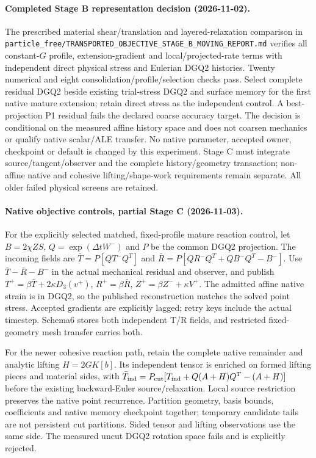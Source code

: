 \documentclass[11pt]{article}
\begin{document}
\paragraph{Completed Stage B representation decision (2026-11-02).}
The prescribed material shear/translation and layered-relaxation comparison in
\texttt{particle\_free/TRANSPORTED\_OBJECTIVE\_STAGE\_B\_MOVING\_REPORT.md}
verifies all constant-$G$ profile, extension-gradient and local/projected-rate
terms with independent direct physical stress and Eulerian DGQ2 histories.
Twenty numerical and eight consolidation/profile/selection checks pass.
Select complete residual DGQ2 beside existing trial-stress DGQ2 and surface
memory for the first native mature extension; retain direct stress as the
independent control. A best-projection P1 residual fails the declared coarse
accuracy target. The decision is conditional on the measured affine history
space and does not coarsen mechanics or qualify native scalar/ALE transfer.
No native parameter, accepted owner, checkpoint or default is changed by this
experiment. Stage C must integrate source/tangent/observer and the complete
history/geometry transaction; non-affine native and cohesive lifting/shape-work
requirements remain separate. All older failed physical screens are retained.


\paragraph{Native objective controls, partial Stage C (2026-11-03).}
For the explicitly selected matched, fixed-profile mature reaction control,
let $B=2\chi ZS$, $Q=\exp(\Delta t W^-)$ and $P$ be the common DGQ2 projection.
The incoming fields are
$\bar T=P[QT^-Q^T]$ and
$\bar R=P[QR^-Q^T+QB^-Q^T-B^-]$.
Use $\bar T-\bar R-B^-$ in the actual mechanical residual and observer, and
publish $T^+=\beta\bar T+2\kappa D_3(v^+)$,
$R^+=\beta\bar R$, $Z^+=\beta Z^-+\kappa V^+$.
The admitted affine native strain is in DGQ2, so the published reconstruction
matches the solved point stress. Accepted gradients are explicitly lagged;
retry keys include the actual timestep. Schema6 stores both independent
T/R fields, and restricted fixed-geometry mesh transfer carries both.

For the newer cohesive reaction path, retain the complete native remainder
and analytic lifting $H=2G K[b]$. Its independent tensor is enriched on formed
lifting pieces and material sides, with
$\bar T_{\rm ind}=P_{\rm cut}[T_{\rm ind}+Q(A+H)Q^T-(A+H)]$ before the existing
backward-Euler source/relaxation. Local source restriction preserves the native
point recurrence. Partition geometry, basis bounds, coefficients and native
memory checkpoint together; temporary candidate tails are not persistent cut
partitions. Sided tensor and lifting observations use the same side. The
measured uncut DGQ2 rotation space fails and is explicitly rejected.
\end{document}
